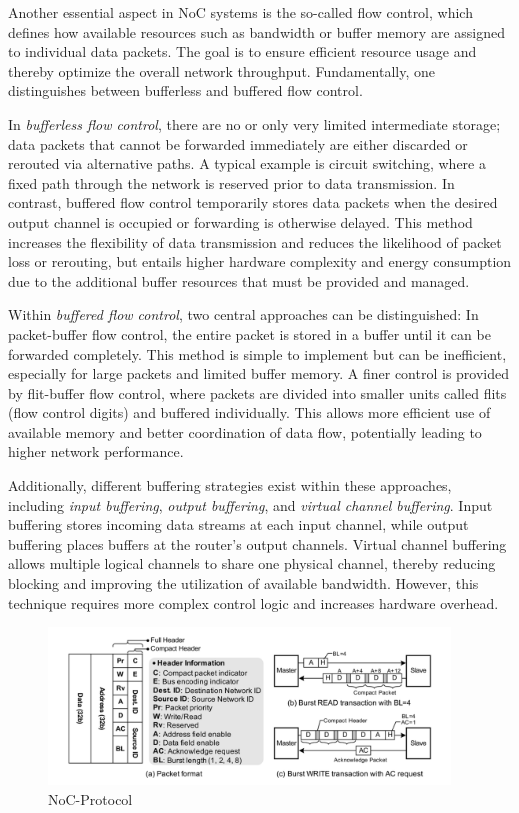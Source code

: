 Another essential aspect in \ac{NoC} systems is the so-called flow control, which defines how available resources such as bandwidth or buffer memory are assigned to individual data packets. The goal is to ensure efficient resource usage and thereby optimize the overall network throughput. Fundamentally, one distinguishes between bufferless and buffered flow control. 

In \textit{bufferless flow control}, there are no or only very limited intermediate storage; data packets that cannot be forwarded immediately are either discarded or rerouted via alternative paths. A typical example is circuit switching, where a fixed path through the network is reserved prior to data transmission. In contrast, buffered flow control temporarily stores data packets when the desired output channel is occupied or forwarding is otherwise delayed. This method increases the flexibility of data transmission and reduces the likelihood of packet loss or rerouting, but entails higher hardware complexity and energy consumption due to the additional buffer resources that must be provided and managed.

Within \textit{buffered flow control}, two central approaches can be distinguished: In packet-buffer flow control, the entire packet is stored in a buffer until it can be forwarded completely. This method is simple to implement but can be inefficient, especially for large packets and limited buffer memory. A finer control is provided by flit-buffer flow control, where packets are divided into smaller units called flits (flow control digits) and buffered individually. This allows more efficient use of available memory and better coordination of data flow, potentially leading to higher network performance.

Additionally, different buffering strategies exist within these approaches, including \textit{input buffering}, \textit{output buffering}, and \textit{virtual channel buffering}. Input buffering stores incoming data streams at each input channel, while output buffering places buffers at the router’s output channels. Virtual channel buffering allows multiple logical channels to share one physical channel, thereby reducing blocking and improving the utilization of available bandwidth. However, this technique requires more complex control logic and increases hardware overhead.\cite{dally_principles_2004}

\begin{figure}[htbp]
    \centering
    \includegraphics[width=0.95\textwidth]{img/NoC Protocol.png}
    \caption{NoC-Protocol~\cite{lee_low-power_2006}}\label{fig:NOC_Protocol}
\end{figure}


